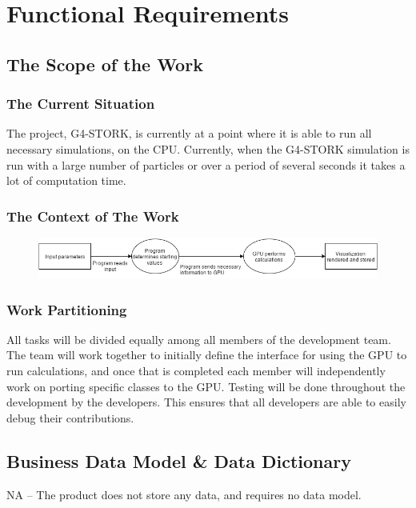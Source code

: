\documentclass[12pt]{article}
\newcommand{\todo}[1]{\textcolor{red}{[TODO: #1]}} \else
\newcommand{\authornote}[3]{} \newcommand{\todo}[1]{} \fi
\newcommand{\ds}[1]{\authornote{blue}{DS}{#1}} %
\begin{document}
\section{Functional Requirements}

\subsection{The Scope of the Work} %
\subsubsection{The Current Situation}
The project, G4-STORK, is currently at a point where it is able to run all necessary simulations, on the CPU. Currently, when the G4-STORK simulation is run with a large number of particles or over a period of several seconds it takes a lot of computation time.

\subsubsection{The Context of The Work}
\begin{figure}[h]
\includegraphics[width=\textwidth]{WorkContextDiagram} 
\end{figure} 
\ds{Figure caption?}
\subsubsection{Work Partitioning}
All tasks will be divided equally among all members of the development team. The team will work together to initially define the interface for using the GPU to run calculations, and once that is completed each member will independently work on porting specific classes to the GPU. Testing will be done throughout the development by the developers. This ensures that all developers are able to easily debug their contributions.
\ds{This section is supposed to show a breakdown of the business use cases}

\subsection{Business Data Model \& Data Dictionary} %
NA -- The product does not store any data, and requires no data model.
\end{document}
